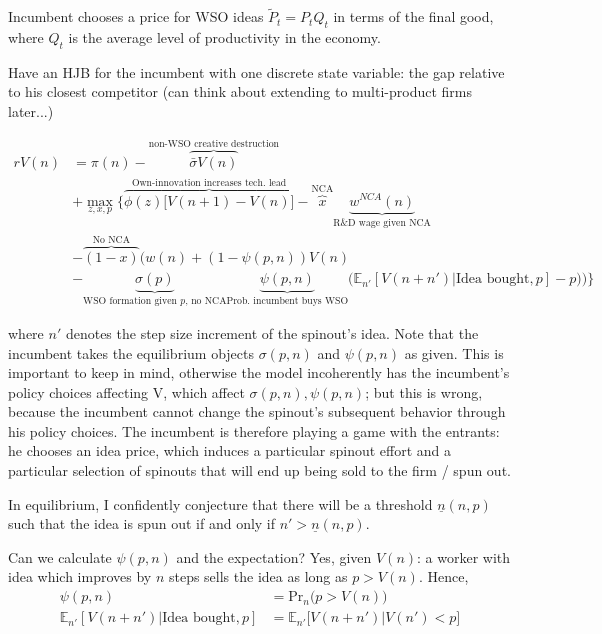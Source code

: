 \documentclass[12pt,english]{article}
\theoremstyle{remark}
\begin{document}
Incumbent chooses a price for WSO ideas $\tilde{P}_t = P_t Q_t$ in terms of the final good, where $Q_t$ is the average level of productivity in the economy. 

Have an HJB for the incumbent with one discrete state variable: the gap relative to his closest competitor (can think about extending to multi-product firms later...)

\begin{align*}
	r V(n) &= \pi (n) - \overbrace{\bar{\sigma}  V(n)}^{\textrm{non-WSO creative destruction}}\\
	       &+ \max_{z,x,p} \Big\{  \overbrace{\phi(z) \Big[ V(n+1) - V(n) \Big]}^{\textrm{Own-innovation increases tech. lead}} - \overbrace{x}^{\textrm{NCA}}\underbrace{w^{NCA}(n)}_{\textrm{R\&D wage given NCA}}   \\
	       &- \overbrace{(1-x)}^{\textrm{No NCA}}\Bigg( w(n) + (1 - \psi(p,n) )V(n)  \\
	       & -  \underbrace{\sigma(p)}_{\textrm{WSO formation given $p$, no NCA}} \underbrace{\psi(p,n)}_{\textrm{Prob. incumbent buys WSO}} \big( \mathbb{E}_{n'}[V(n + n') | \textrm{Idea bought}, p] - p \big) \Bigg) \Bigg\}
\end{align*}

where $n'$ denotes the step size increment of the spinout's idea. Note that the incumbent takes the equilibrium objects $\sigma(p,n)$ and $\psi(p,n)$ as given. This is important to keep in mind, otherwise the model incoherently has the incumbent's policy choices affecting V, which affect $\sigma(p,n), \psi(p,n)$; but this is wrong, because the incumbent cannot change the spinout's subsequent behavior through his policy choices. The incumbent is therefore playing a game with the entrants: he chooses an idea price, which induces a particular spinout effort and a particular selection of spinouts that will end up being sold to the firm / spun out.

In equilibrium, I confidently conjecture that there will be a threshold $\underline{n}(n,p)$ such that the idea is spun out if and only if $n' > \underline{n} (n,p)$.

Can we calculate $\psi(p,n)$ and the expectation? Yes, given $V(n)$: a worker with idea which improves by $n$ steps sells the idea as long as $p > V(n)$. Hence, 
\begin{align}
	\psi(p,n) &= \mathrm{Pr}_n\Big( p > V(n)\Big) \\
	\mathbb{E}_{n'}[V(n + n') | \textrm{Idea bought}, p]  &= \mathbb{E}_{n'} \Big[ V(n + n') | V(n') < p\Big]
\end{align}
\end{document}
